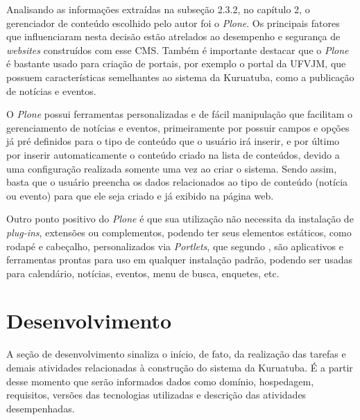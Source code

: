 \hspace{2.5cm}

Analisando as informações extraídas na subseção 2.3.2, no capítulo 2, o gerenciador de conteúdo escolhido pelo autor foi o \textit{Plone}. Os principais fatores que influenciaram nesta decisão estão atrelados ao desempenho e segurança de \textit{websites} construídos com esse CMS. Também é importante destacar que o \textit{Plone} é bastante usado para criação de portais, por exemplo o portal da UFVJM, que possuem características semelhantes ao sistema da Kuruatuba, como a publicação de notícias e eventos. 

O \textit{Plone} possui ferramentas personalizadas e de fácil manipulação que facilitam o gerenciamento de notícias e eventos, primeiramente por possuir campos e opções já pré definidos para o tipo de conteúdo que o usuário irá inserir, e por último por inserir automaticamente o conteúdo criado na lista de conteúdos, devido a uma configuração realizada somente uma vez ao criar o sistema. Sendo assim, basta que o usuário preencha os dados relacionados ao tipo de conteúdo (notícia ou evento) para que ele seja criado e já exibido na página web.

Outro ponto positivo do \textit{Plone} é que sua utilização não necessita da instalação de \textit{plug-ins}, extensões ou complementos, podendo ter seus elementos estáticos, como rodapé e cabeçalho, personalizados via \textit{Portlets}, que segundo , são aplicativos e ferramentas prontas para uso em qualquer instalação padrão, podendo ser usadas para calendário, notícias, eventos, menu de busca, enquetes, etc. 

\hspace{2.5cm}

\section{Desenvolvimento}
\label{sec:desenvolvimento}

\hspace{2.5cm}

A seção de desenvolvimento sinaliza o início, de fato, da realização das tarefas e demais atividades relacionadas à construção do sistema da Kuruatuba. É a partir desse momento que serão informados dados como domínio, hospedagem, requisitos, versões das tecnologias utilizadas e descrição das atividades desempenhadas.

